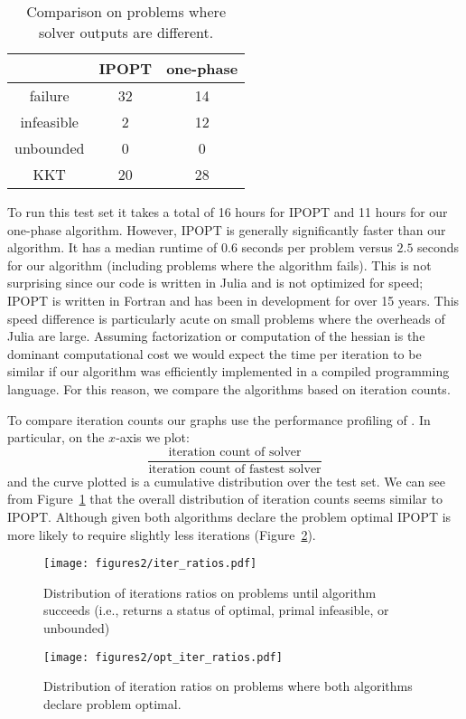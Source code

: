 \documentclass{article}
\begin{document}
\begin{table}[H]
\caption{Comparison on problems where solver outputs are different.}\label{compare-outputs}
\begin{tabular}{| c | c | c |}
& IPOPT & one-phase \\
\hline
failure &  32 & 14 \\ 
infeasible & 2 & 12 \\  
unbounded & 0 & 0 \\
KKT & 20 & 28 
\end{tabular}
\end{table}

To run this test set it takes a total of 16 hours for IPOPT and 11 hours for our one-phase algorithm. However, IPOPT is generally significantly faster than our algorithm. It has a median runtime of $0.6$ seconds per problem versus $2.5$ seconds for our algorithm (including problems where the algorithm fails). This is not surprising since our code is written in Julia and is not optimized for speed; IPOPT is written in Fortran and has been in development for over 15 years. This speed difference is particularly acute on small problems where the overheads of Julia are large. Assuming factorization or computation of the hessian is the dominant computational cost we would expect the time per iteration to be similar if our algorithm was efficiently implemented in a compiled programming language. For this reason, we compare the algorithms based on iteration counts.
 
To compare iteration counts our graphs use the performance profiling of \citet*{dolan2002benchmarking}. In particular, on the $x$-axis we plot:
$$
\frac{\text{iteration count of solver}}{\text{iteration count of fastest solver}}
$$
and the curve plotted is a cumulative distribution over the test set. We can see from Figure~\ref{fig:iter-count-CUTEst} that the overall distribution of iteration counts seems similar to IPOPT. Although given both algorithms declare the problem optimal IPOPT is more likely to require slightly less iterations (Figure~\ref{fig:iter-count-CUTEst-opt}).

\begin{figure}[H]
\texttt{[image: figures2/iter\_ratios.pdf]}
\caption{Distribution of iterations ratios on problems until algorithm succeeds (i.e., returns a status of optimal, primal infeasible, or unbounded)}\label{fig:iter-count-CUTEst}
\end{figure}

\begin{figure}[H]
\texttt{[image: figures2/opt\_iter\_ratios.pdf]}
\caption{Distribution of iteration ratios on problems where both algorithms declare problem optimal.}\label{fig:iter-count-CUTEst-opt}
\end{figure}
\end{document}
